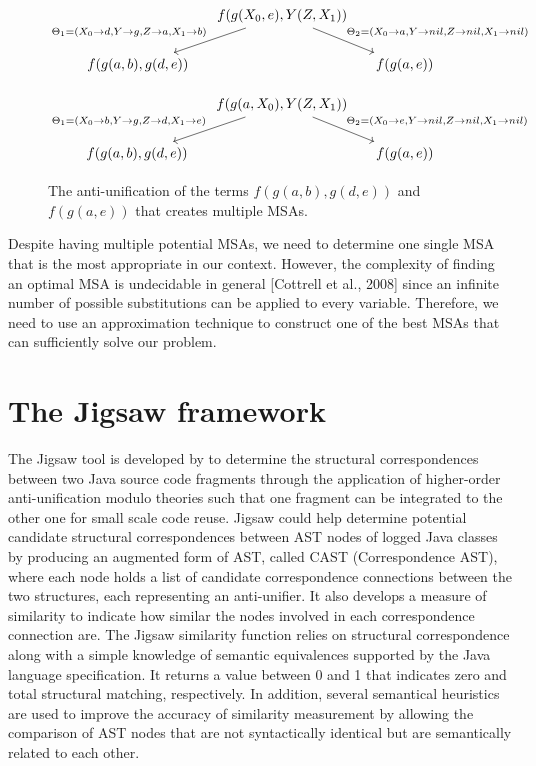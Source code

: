 \begin{figure} [H]
\[
\begin{tikzcd}[column sep=small]
&
  f(g(X_0,e),Y(Z,X_1))
  \arrow{dr}{\Theta_2 = ( X_0 \rightarrow a, Y \rightarrow nil, Z \rightarrow nil, X_1 \rightarrow nil) }
  \arrow[->,swap]{dl}{\Theta_1 = ( X_0 \rightarrow d, Y \rightarrow g, Z \rightarrow a, X_1 \rightarrow b)} %
\\
f(g(a,b), g(d,e))
&&
f(g(a,e))
\end{tikzcd}
\]	

\[
\begin{tikzcd}[column sep=small]
&
  f(g(a,X_0),Y(Z,X_1))
  \arrow{dr}{\Theta_2 = ( X_0 \rightarrow e, Y \rightarrow nil, Z \rightarrow nil, X_1 \rightarrow nil) }
  \arrow[->,swap]{dl}{\Theta_1 = ( X_0 \rightarrow b, Y \rightarrow g, Z \rightarrow d, X_1 \rightarrow e)} %
\\
f(g(a,b), g(d,e))
&&
f(g(a,e))
\end{tikzcd}
\]
  \caption{The anti-unification of the terms $f(g(a,b), g(d,e))$
and $f(g(a,e))$ that creates multiple MSAs.}
  \label{fig:multipleMSA}
\end{figure}


Despite having multiple potential MSAs, we need to determine one single MSA that is the most appropriate in our context. However, the complexity of finding an optimal MSA is undecidable in general [Cottrell et al., 2008] since an infinite number of possible substitutions can be applied to every variable. Therefore, we need to use an approximation technique to construct one of the best MSAs that can sufficiently solve our problem.


\section{The Jigsaw framework}  \label{Jigsaw}
The Jigsaw tool is developed by \citet{2008:fse:cottrell} to determine the structural correspondences between two Java source code fragments through the application of higher-order anti-unification modulo theories such that one fragment can be integrated to the other one for small scale code reuse. Jigsaw could help determine potential candidate structural correspondences between AST nodes of logged Java classes by producing an augmented form of AST, called CAST (Correspondence AST), where each node holds a list of candidate correspondence connections between the two structures, each representing an anti-unifier. It also develops a measure of similarity to indicate how similar the nodes involved in each correspondence connection are. The Jigsaw similarity function relies on structural correspondence along with a simple knowledge of semantic equivalences supported by the Java language specification. It returns a value between 0 and 1 that indicates zero and total structural matching, respectively. In addition, several semantical heuristics are used to improve the accuracy of similarity measurement by allowing the comparison of AST nodes that are not syntactically identical but are semantically related to each other.

